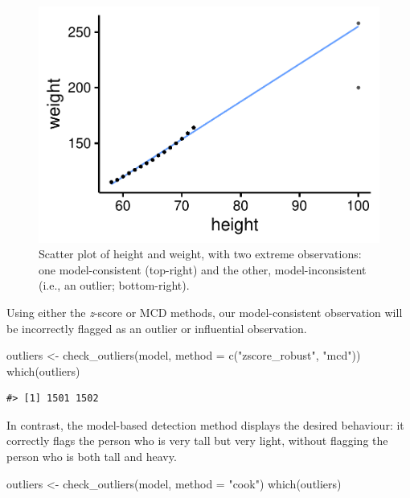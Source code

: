 \documentclass{article}
\newenvironment{Shaded}{\begin{snugshade}}{\end{snugshade}}
\newcommand{\AttributeTok}[1]{\textcolor[rgb]{0.77,0.63,0.00}{#1}}
\newcommand{\FunctionTok}[1]{\textcolor[rgb]{0.00,0.00,0.00}{#1}}
\newcommand{\NormalTok}[1]{#1}
\newcommand{\OtherTok}[1]{\textcolor[rgb]{0.56,0.35,0.01}{#1}}
\newcommand{\StringTok}[1]{\textcolor[rgb]{0.31,0.60,0.02}{#1}}
\begin{document}
\begin{figure}
\includegraphics[width=1\linewidth]{paper_files/figure-latex/scatter-1} \caption{Scatter plot of height and weight, with two extreme observations: one model-consistent (top-right) and the other, model-inconsistent (i.e., an outlier; bottom-right).}\label{fig:scatter}
\end{figure}

Using either the \emph{z}-score or MCD methods, our model-consistent
observation will be incorrectly flagged as an outlier or influential
observation.

\begin{Shaded}
\begin{Highlighting}[]
\NormalTok{outliers }\OtherTok{\textless{}{-}} \FunctionTok{check\_outliers}\NormalTok{(model, }\AttributeTok{method =} \FunctionTok{c}\NormalTok{(}\StringTok{"zscore\_robust"}\NormalTok{, }\StringTok{"mcd"}\NormalTok{))}
\FunctionTok{which}\NormalTok{(outliers)}
\end{Highlighting}
\end{Shaded}

\begin{verbatim}
#> [1] 1501 1502
\end{verbatim}

In contrast, the model-based detection method displays the desired
behaviour: it correctly flags the person who is very tall but very
light, without flagging the person who is both tall and heavy.

\begin{Shaded}
\begin{Highlighting}[]
\NormalTok{outliers }\OtherTok{\textless{}{-}} \FunctionTok{check\_outliers}\NormalTok{(model, }\AttributeTok{method =} \StringTok{"cook"}\NormalTok{)}
\FunctionTok{which}\NormalTok{(outliers)}
\end{Highlighting}
\end{Shaded}
\end{document}
